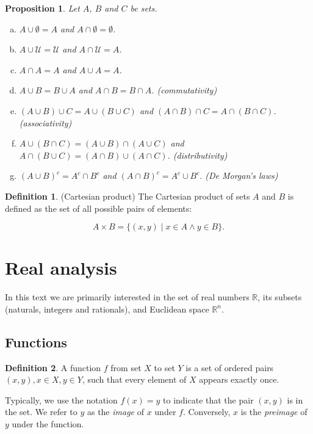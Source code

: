 \documentclass{book}
\theoremstyle{plain}%
\newtheorem{proposition}{Proposition}[section]
\theoremstyle{definition}
\newtheorem{definition}{Definition}[section]
\begin{document}
\begin{appendices}
\begin{proposition} Let $A$, $B$ and $C$ be sets.
\begin{enumerate}[(a)]
\item $A \cup \emptyset = A$ and $A \cap \emptyset = \emptyset$.
\item $A \cup \mathcal{U} = \mathcal{U}$ and $A \cap \mathcal{U} = A$.
\item $A \cap A = A$ and $A \cup A = A$.
\item $A \cup B = B \cup A$ and $A \cap B = B \cap A$. (commutativity)
\item $(A \cup B) \cup C = A \cup (B \cup C)$ and $(A \cap B) \cap C = A \cap (B \cap C)$. (associativity)
\item $A \cup (B \cap C) = (A \cup B) \cap (A \cup C)$ and $A \cap (B \cup C) = (A \cap B) \cup (A \cap C)$. (distributivity)
\item $(A \cup B)^c = A^c \cap B^c$ and $(A \cap B)^c = A^c \cup B^c.$ (De Morgan's laws)
\end{enumerate}
\end{proposition}

\begin{definition}(Cartesian product) The Cartesian product of sets $A$ and $B$ is defined as the set of all possible pairs of elements:

$$A \times B = \{(x,y) \mid x \in A \wedge y \in B\}.$$
\end{definition}

\section{Real analysis}

In this text we are primarily interested in the set of real numbers $\mathbb{R}$, its subsets (naturals, integers and rationals), and Euclidean space $\mathbb{R}^n$.

\subsection*{Functions}

\begin{definition} A function $f$ from set $X$ to set $Y$ is a set of ordered pairs $(x, y), x \in X, y \in Y$, such that every element of $X$ appears exactly once.

Typically, we use the notation $f(x) = y$ to indicate that the pair $(x,y)$ is in the set. We refer to $y$ as the \textit{image} of $x$ under $f$. Conversely, $x$ is the \emph{preimage} of $y$ under the function.


\end{definition}
\end{appendices}
\end{document}
